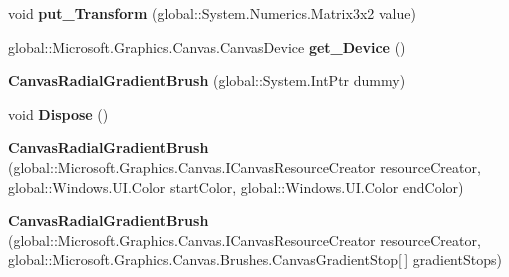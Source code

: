 \begin{DoxyCompactItemize}
void {\bfseries put\+\_\+\+Transform} (global\+::\+System.\+Numerics.\+Matrix3x2 value)
\item 
\mbox{\label{class_microsoft_1_1_graphics_1_1_canvas_1_1_brushes_1_1_canvas_radial_gradient_brush_abf8d1732862df46e88534c9d5c94fa6d}} 
global\+::\+Microsoft.\+Graphics.\+Canvas.\+Canvas\+Device {\bfseries get\+\_\+\+Device} ()
\item 
\mbox{\label{class_microsoft_1_1_graphics_1_1_canvas_1_1_brushes_1_1_canvas_radial_gradient_brush_ad4094bf0b0928b39a9f4e4e479112201}} 
{\bfseries Canvas\+Radial\+Gradient\+Brush} (global\+::\+System.\+Int\+Ptr dummy)
\item 
\mbox{\label{class_microsoft_1_1_graphics_1_1_canvas_1_1_brushes_1_1_canvas_radial_gradient_brush_a7aea17ea64376e07a9c103770bcdbe55}} 
void {\bfseries Dispose} ()
\item 
\mbox{\label{class_microsoft_1_1_graphics_1_1_canvas_1_1_brushes_1_1_canvas_radial_gradient_brush_a63863bff18c4d0e79ecfc400e0f0752f}} 
{\bfseries Canvas\+Radial\+Gradient\+Brush} (global\+::\+Microsoft.\+Graphics.\+Canvas.\+I\+Canvas\+Resource\+Creator resource\+Creator, global\+::\+Windows.\+U\+I.\+Color start\+Color, global\+::\+Windows.\+U\+I.\+Color end\+Color)
\item 
\mbox{\label{class_microsoft_1_1_graphics_1_1_canvas_1_1_brushes_1_1_canvas_radial_gradient_brush_aa2c2fd59d76619f8d908b988059d5e2c}} 
{\bfseries Canvas\+Radial\+Gradient\+Brush} (global\+::\+Microsoft.\+Graphics.\+Canvas.\+I\+Canvas\+Resource\+Creator resource\+Creator, global\+::\+Microsoft.\+Graphics.\+Canvas.\+Brushes.\+Canvas\+Gradient\+Stop\mbox{[}$\,$\mbox{]} gradient\+Stops)
\item 
\mbox{\label{class_microsoft_1_1_graphics_1_1_canvas_1_1_brushes_1_1_canvas_radial_gradient_brush_a72a997087b68baa682963acf4c7547b0}} 

\end{DoxyCompactItemize}
